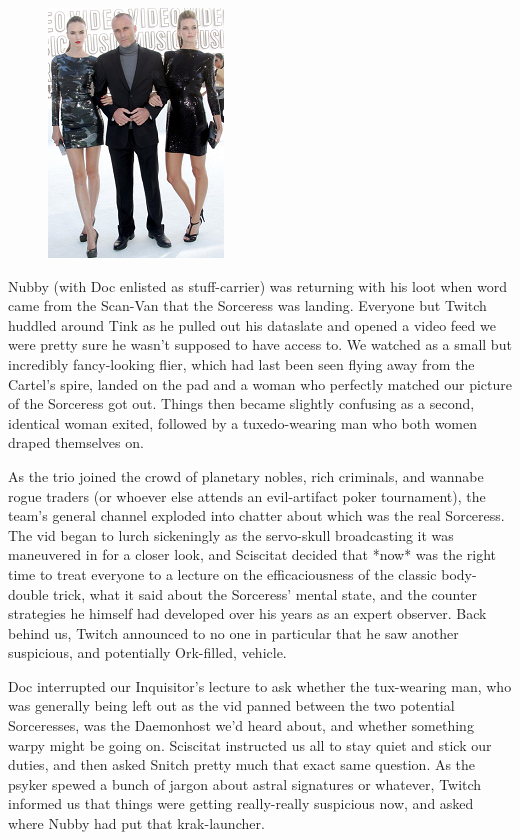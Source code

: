 \begin{figure}
	\begin{center}
		\includegraphics[width=\figwidth]{pics/18/50.png}
	\end{center}
\end{figure}
Nubby (with Doc enlisted as stuff-carrier) was returning with his loot when word came from the Scan-Van that the Sorceress was landing. 
Everyone but Twitch huddled around Tink as he pulled out his dataslate and opened a video feed we were pretty sure he wasn't supposed to have access to. 
We watched as a small but incredibly fancy-looking flier, which had last been seen flying away from the Cartel's spire, landed on the pad and a woman who perfectly matched our picture of the Sorceress got out. 
Things then became slightly confusing as a second, identical woman exited, followed by a tuxedo-wearing man who both women draped themselves on.

As the trio joined the crowd of planetary nobles, rich criminals, and wannabe rogue traders (or whoever else attends an evil-artifact poker tournament), the team's general channel exploded into chatter about which was the real Sorceress. 
The vid began to lurch sickeningly as the servo-skull broadcasting it was maneuvered in for a closer look, and Sciscitat decided that *now* was the right time to treat everyone to a lecture on the efficaciousness of the classic body-double trick, what it said about the Sorceress' mental state, and the counter strategies he himself had developed over his years as an expert observer. 
Back behind us, Twitch announced to no one in particular that he saw another suspicious, and potentially Ork-filled, vehicle.

Doc interrupted our Inquisitor's lecture to ask whether the tux-wearing man, who was generally being left out as the vid panned between the two potential Sorceresses, was the Daemonhost we'd heard about, and whether something warpy might be going on. 
Sciscitat instructed us all to stay quiet and stick our duties, and then asked Snitch pretty much that exact same question. 
As the psyker spewed a bunch of jargon about astral signatures or whatever, Twitch informed us that things were getting really-really suspicious now, and asked where Nubby had put that krak-launcher.

